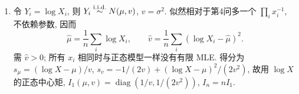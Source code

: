 \begin{solution}
\begin{enumerate}[label=\arabic*.]
对于同时未知的 $(a,\lambda)$, 常规正则 Fisher 信息不良定义, 因为支撑边界随 $a$ 移动. 这不是得分二阶矩发散: 若忽略移动边界, 对 $x>a$ 求普通导数, 得形式得分
$\widetilde s=(\lambda,\,1/\lambda-(X-a))^{\mathsf T}$,
其二阶矩确实存在, 为
\[
\E(\widetilde s\widetilde s^{\mathsf T})
=\begin{pmatrix}\lambda^2&0\\0&1/\lambda^2\end{pmatrix}.
\]
但 $\E\widetilde s_a=\lambda\ne0$, 而形式负 Hessian 的期望为
$\left(\begin{smallmatrix}0&-1\\-1&1/\lambda^2\end{smallmatrix}\right)$,
与前式不同且非半正定. 移动支撑产生的边界项不能省略, 所以不能把这一形式二阶矩当作满足正则信息恒等式的矩阵, 也不能套用通常的二维 MLE 渐近正态公式. 如果仅把 Fisher 信息定义为几乎处处普通得分的二阶矩, 上面已给出该量; 本题的正则性判断与该定义区别必须保留. 若 $a$ 已知、只估计 $\lambda$, 则它退化为普通指数模型, 信息为 $1/\lambda^2$.
\item 令 $Y_i=\log X_i$, 则 $Y_i\stackrel{\mathrm{i.i.d.}}{\sim} N(\mu,v)$, $v=\sigma^2$. 似然相对于第4问多一个 $\prod_i x_i^{-1}$, 不依赖参数, 因而
\[
\hat\mu=\frac1n\sum_i\log X_i,\qquad
\hat v=\frac1n\sum_i(\log X_i-\hat\mu)^2.
\]
需 $\hat v>0$; 所有 $x_i$ 相同时与正态模型一样没有有限 MLE. 得分为 $s_\mu=(\log X-\mu)/v$, $s_v=-1/(2v)+(\log X-\mu)^2/(2v^2)$, 故用 $\log X$ 的正态中心矩,
$I_1(\mu,v)=\operatorname{diag}(1/v,1/(2v^2))$, $I_n=nI_1$.\qedhere
\end{enumerate}
\end{solution}

